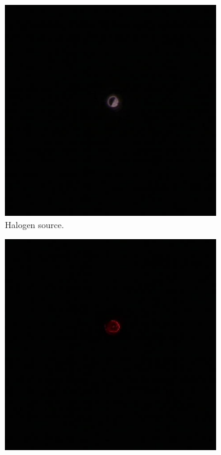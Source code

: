 \documentclass[a4paper, 12pt]{paper}
\begin{document}
\begin{figure}[h]
    \centering
    \begin{subfigure}[p]{0.30\textwidth}
        \includegraphics[width=\textwidth]{img/halogen_source}
        \caption{Halogen source.}
    \end{subfigure}
    \begin{subfigure}[p]{0.30\textwidth}
        \includegraphics[width=\textwidth]{img/led_source}

\end{subfigure}
\end{figure}
\end{document}
